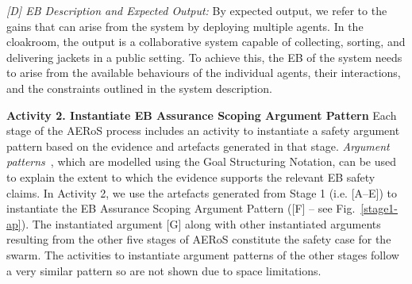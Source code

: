 \documentclass[runningheads]{llncs}
\begin{document}
\emph{[D] EB Description and Expected Output:}
By expected output, we refer to the gains that can arise from the system by deploying multiple agents. 
In the cloakroom, the output is a collaborative system capable of collecting, sorting, and delivering jackets in a public setting. 
To achieve this, the EB of the system needs to %
arise from the available behaviours of the individual agents, their interactions, and the constraints outlined in the system description.

\noindent\textbf{Activity 2. Instantiate EB Assurance Scoping Argument Pattern} Each stage of the AERoS process includes an activity to instantiate a safety argument pattern based on the evidence and artefacts generated in that stage. %
\emph{Argument patterns}~\cite{Hawkins2021}, which are modelled using the Goal Structuring Notation, can be used to explain the extent to which the evidence supports the relevant EB safety claims.  
In Activity 2, we use the artefacts generated from Stage 1 (i.e. [A–E]) to instantiate the EB Assurance Scoping Argument Pattern ([F] – see Fig.~\ref{stage1-ap}). 
The instantiated argument [G] along with other instantiated arguments resulting from the other five stages of AERoS constitute the safety case for the swarm. The activities to instantiate argument patterns of the other stages follow a very similar pattern so are not shown due to space limitations.
\end{document}
